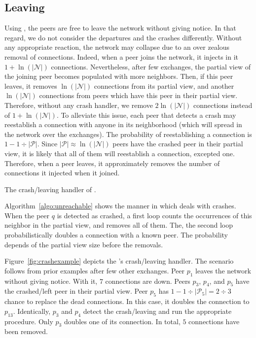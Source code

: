 \subsection{Leaving}
\label{subsec:leaving}

Using \SPRAY, the peers are free to leave the network without giving
notice. In that regard, we do not consider the departures and the crashes
differently.  Without any appropriate reaction, the network may collapse due to
an over zealous removal of connections. Indeed, when a peer joins the network,
it injects in it $1+\ln(|\mathcal{N}|)$ connections. Nevertheless, after few
exchanges, the partial view of the joining peer becomes populated with more
neighbors. Then, if this peer leaves, it removes $\ln(|\mathcal{N}|)$
connections from its partial view, and another $\ln(|\mathcal{N}|)$ connections
from peers which have this peer in their partial view. Therefore, without any
crash handler, we remove $2\ln(|\mathcal{N}|)$ connections instead of
$1+\ln(|\mathcal{N}|)$. To alleviate this issue, each peer that detects a crash
may reestablish a connection with anyone in its neighborhood (which will spread
in the network over the exchanges). The probability of reestablishing a
connection is $1-{1\div{|\mathcal{P}|}}$. Since
${|\mathcal{P}|}\approx \ln(|\mathcal{N}|)$ peers have the crashed peer in
their partial view, it is likely that all of them will reestablish a
connection, excepted one. Therefore, when a peer leaves, it approximately
removes the number of connections it injected when it joined.

\begin{algorithm}[h]
  
  \caption{\label{algo:unreachable}The crash/leaving handler of \SPRAY.}
\end{algorithm}

Algorithm~\ref{algo:unreachable} shows the manner in which \SPRAY deals
with crashes. When the peer $q$ is detected as crashed, a first loop counts the
occurrences of this neighbor in the partial view, and removes all of them. The,
the second loop probabilistically doubles a connection with a known peer. The
probability depends of the partial view size before the removals.

Figure~\ref{fig:crashexample} depicts the \SPRAY's crash/leaving
handler. The scenario follows from prior examples after few other
exchanges. Peer $p_1$ leaves the network without giving notice. With
it, $7$ connections are down. Peers $p_3$, $p_4$, and $p_5$ have the
crashed/left peer in their partial view. Peer $p_5$ has
$1-{1\div{|\mathcal{P}_5|}}={2\div{3}}$ chance to replace the dead
connections. In this case, it doubles the connection to
$p_{13}$. Identically, $p_3$ and $p_4$ detect the crash/leaving and
run the appropriate procedure. Only $p_3$ doubles one of its
connection. In total, $5$ connections have been removed.  


